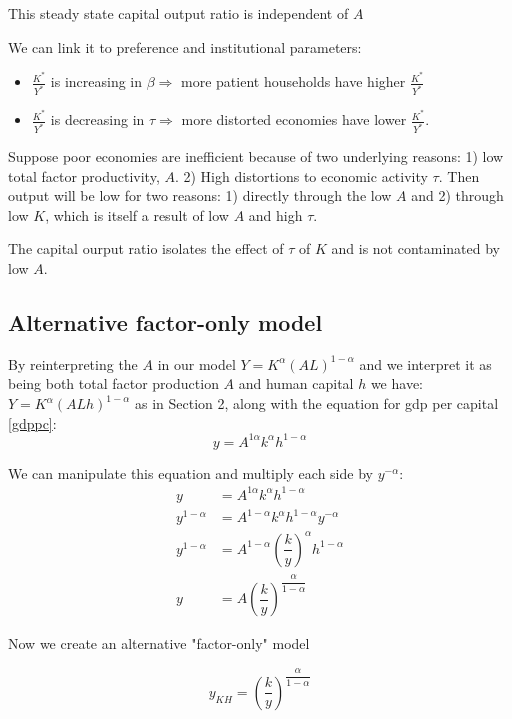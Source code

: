 \documentclass[11pt]{article}
\begin{document}
\begin{note}
    This steady state capital output ratio is independent of $A$
\end{note}

We can link it to preference and institutional parameters:
\begin{itemize}
    \item $\frac{K^*}{Y^*}$ is increasing in $\beta \Rightarrow$ more patient households have higher $\frac{K^*}{Y^*}$
    \item $\frac{K^*}{Y^*}$ is decreasing in $\tau \Rightarrow$ more distorted economies have lower $\frac{K^*}{Y^*}$.
\end{itemize}

Suppose poor economies are inefficient because of two underlying reasons: 1) low total factor productivity, $A$. 2) High distortions to economic activity $\tau$. Then output will be low for two reasons: 1) directly through the low $A$ and 2) through low $K$, which is itself a result of low $A$ and high $\tau$.

The capital ourput ratio isolates the effect of $\tau$ of $K$ and is not contaminated by low $A$.

\subsection{Alternative factor-only model}

By reinterpreting the $A$ in our model $Y= K^\alpha(AL)^{1-\alpha}$ and we interpret it as being both total factor production $A$ and human capital $h$ we have: $Y = K^\alpha(ALh)^{1-\alpha}$ as in Section 2, along with the equation for gdp per capital \eqref{gdppc}:
\[y = A^{1\alpha}k^\alpha h^{1-\alpha}\]

We can manipulate this equation and multiply each side by $y^{-\alpha}$:
\begin{align*}
    y &= A^{1\alpha}k^\alpha h^{1-\alpha} \\
    y^{1-\alpha} &= A^{1-\alpha}k^\alpha h^{1-\alpha}y^{-\alpha} \\
    y^{1-\alpha} &= A^{1-\alpha} \left(\dfrac{k}{y}\right)^\alpha h^{1-\alpha} \\
    y &= A \left(\dfrac{k}{y}\right)^{\dfrac{\alpha}{1-\alpha}}
\end{align*}

\begin{mdframed}
Now we create an alternative "factor-only" model

\begin{equation}
    \label{alt factor only}
    y_{KH} = \left(\dfrac{k}{y}\right)^{\dfrac{\alpha}{1-\alpha}}
\end{equation}
\end{mdframed}
\end{document}
